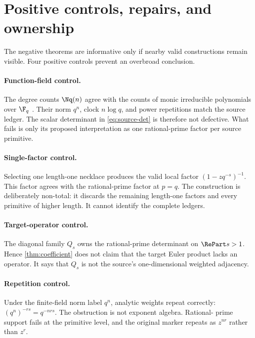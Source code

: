 \section{Positive controls, repairs, and ownership}
\label{sec:repairs}

The negative theorems are informative only if nearby valid constructions
remain visible. Four positive controls prevent an overbroad conclusion.

\paragraph{Function-field control.}
The degree counts $\Nq(n)$ agree with the counts of monic irreducible
polynomials over $\F_q$ \citep{chebolu2026necklace}. Their norm $q^n$, clock
$n\log q$, and power repetitions match the source ledger. The scalar
determinant in \cref{eq:source-det} is therefore not defective. What fails is
only its proposed interpretation as one rational-prime factor per source
primitive.

\paragraph{Single-factor control.}
Selecting one length-one necklace produces the valid local factor
$(1-zq^{-s})^{-1}$. This factor agrees with the rational-prime factor at
$p=q$. The construction is deliberately non-total: it discards the remaining
length-one factors and every primitive of higher length. It cannot identify
the complete ledgers.

\paragraph{Target-operator control.}
The diagonal family $Q_s$ owns the rational-prime determinant on
$\RePart s>1$. Hence \cref{thm:coefficient} does not claim that the target
Euler product lacks an operator. It says that $Q_s$ is not the source's
one-dimensional weighted adjacency.

\paragraph{Repetition control.}
Under the finite-field norm label $q^n$, analytic weights repeat correctly:
$(q^n)^{-rs}=q^{-nrs}$. The obstruction is not exponent algebra. Rational-
prime support fails at the primitive level, and the original marker repeats
as $z^{nr}$ rather than $z^r$.

